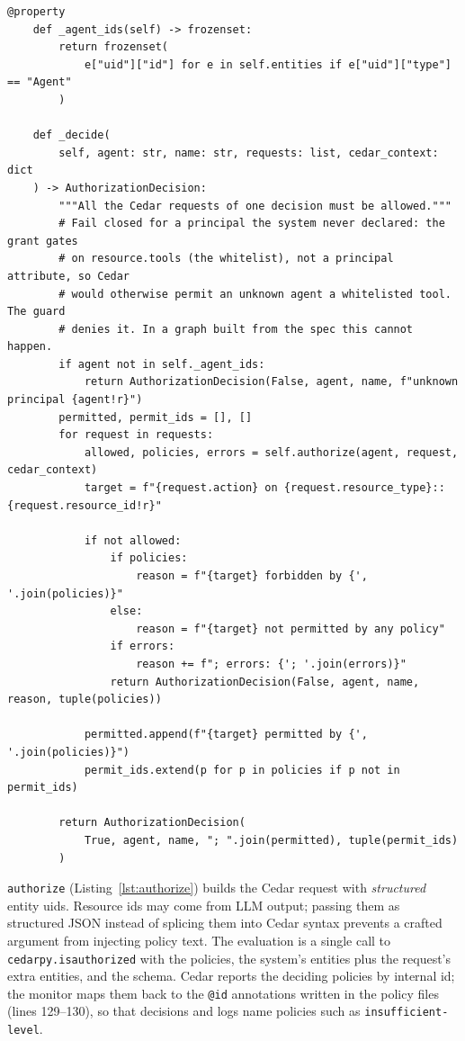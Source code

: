 \documentclass[11pt,a4paper]{article}
\DeclareRobustCommand{\code}[1]{{\renewcommand{\_}{\textunderscore\allowbreak}\texttt{#1}}}
\begin{document}
\begin{lstlisting}[firstnumber=79,style=py,caption={All requests of a decision must be allowed (\texttt{engine/engine.py}, lines 79--113)},label={lst:decide}]
    @property
    def _agent_ids(self) -> frozenset:
        return frozenset(
            e["uid"]["id"] for e in self.entities if e["uid"]["type"] == "Agent"
        )

    def _decide(
        self, agent: str, name: str, requests: list, cedar_context: dict
    ) -> AuthorizationDecision:
        """All the Cedar requests of one decision must be allowed."""
        # Fail closed for a principal the system never declared: the grant gates
        # on resource.tools (the whitelist), not a principal attribute, so Cedar
        # would otherwise permit an unknown agent a whitelisted tool. The guard
        # denies it. In a graph built from the spec this cannot happen.
        if agent not in self._agent_ids:
            return AuthorizationDecision(False, agent, name, f"unknown principal {agent!r}")
        permitted, permit_ids = [], []
        for request in requests:
            allowed, policies, errors = self.authorize(agent, request, cedar_context)
            target = f"{request.action} on {request.resource_type}::{request.resource_id!r}"

            if not allowed:
                if policies:
                    reason = f"{target} forbidden by {', '.join(policies)}"
                else:
                    reason = f"{target} not permitted by any policy"
                if errors:
                    reason += f"; errors: {'; '.join(errors)}"
                return AuthorizationDecision(False, agent, name, reason, tuple(policies))

            permitted.append(f"{target} permitted by {', '.join(policies)}")
            permit_ids.extend(p for p in policies if p not in permit_ids)

        return AuthorizationDecision(
            True, agent, name, "; ".join(permitted), tuple(permit_ids)
        )
\end{lstlisting}

\code{authorize} (Listing~\ref{lst:authorize}) builds the Cedar request with
\emph{structured} entity uids. Resource ids may come from LLM output; passing them as
structured JSON instead of splicing them into Cedar syntax prevents a crafted argument
from injecting policy text. The evaluation is a single call to
\code{cedarpy.is\_authorized} with the policies, the system's entities plus the request's
extra entities, and the schema. Cedar reports the deciding policies by internal id;
the monitor maps them back to the \code{@id} annotations written in the policy files
(lines 129--130), so that decisions and logs name policies such as
\code{insufficient-level}.
\end{document}
